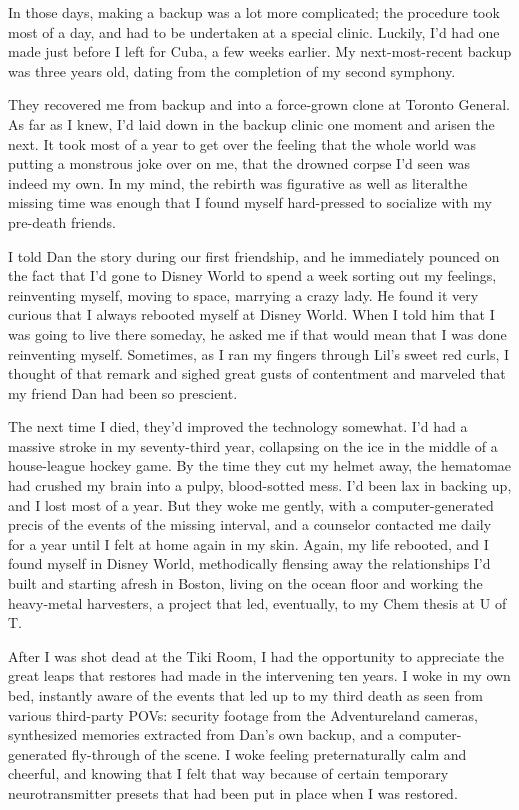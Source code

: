 In those days, making a backup was a lot more complicated; the
procedure took most of a day, and had to be undertaken at a special
clinic. Luckily, I'd had one made just before I left for Cuba, a
few weeks earlier. My next-most-recent backup was three years old,
dating from the completion of my second symphony.

They recovered me from backup and into a force-grown clone at
Toronto General. As far as I knew, I'd laid down in the backup
clinic one moment and arisen the next. It took most of a year to
get over the feeling that the whole world was putting a monstrous
joke over on me, that the drowned corpse I'd seen was indeed my
own. In my mind, the rebirth was figurative as well as literal{\dash}the
missing time was enough that I found myself hard-pressed to
socialize with my pre-death friends.

I told Dan the story during our first friendship, and he
immediately pounced on the fact that I'd gone to Disney World to
spend a week sorting out my feelings, reinventing myself, moving to
space, marrying a crazy lady. He found it very curious that I
always rebooted myself at Disney World. When I told him that I was
going to live there someday, he asked me if that would mean that I
was done reinventing myself. Sometimes, as I ran my fingers through
Lil's sweet red curls, I thought of that remark and sighed great
gusts of contentment and marveled that my friend Dan had been so
prescient.

The next time I died, they'd improved the technology somewhat. I'd
had a massive stroke in my seventy-third year, collapsing on the
ice in the middle of a house-league hockey game. By the time they
cut my helmet away, the hematomae had crushed my brain into a
pulpy, blood-sotted mess. I'd been lax in backing up, and I lost
most of a year. But they woke me gently, with a computer-generated
precis of the events of the missing interval, and a counselor
contacted me daily for a year until I felt at home again in my
skin. Again, my life rebooted, and I found myself in Disney World,
methodically flensing away the relationships I'd built and starting
afresh in Boston, living on the ocean floor and working the
heavy-metal harvesters, a project that led, eventually, to my Chem
thesis at U of T.

After I was shot dead at the Tiki Room, I had the opportunity to
appreciate the great leaps that restores had made in the
intervening ten years. I woke in my own bed, instantly aware of the
events that led up to my third death as seen from various
third-party POVs: security footage from the Adventureland cameras,
synthesized memories extracted from Dan's own backup, and a
computer-generated fly-through of the scene. I woke feeling
preternaturally calm and cheerful, and knowing that I felt that way
because of certain temporary neurotransmitter presets that had been
put in place when I was restored.

